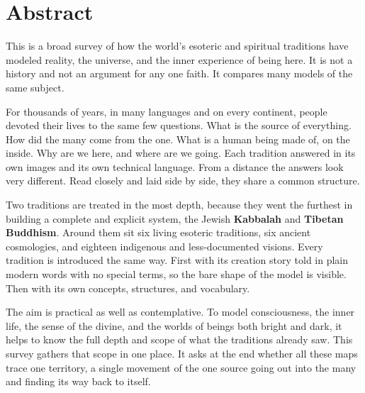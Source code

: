 \chapter*{Abstract}

This is a broad survey of how the world's esoteric and spiritual traditions have modeled reality, the
universe, and the inner experience of being here. It is not a history and not an argument for any one faith.
It compares many models of the same subject.

For thousands of years, in many languages and on every continent, people devoted their lives to the same few
questions. What is the source of everything. How did the many come from the one. What is a human being made
of, on the inside. Why are we here, and where are we going. Each tradition answered in its own images and its
own technical language. From a distance the answers look very different. Read closely and laid side by side,
they share a common structure.

Two traditions are treated in the most depth, because they went the furthest in building a complete and
explicit system, the Jewish \textbf{Kabbalah} and \textbf{Tibetan Buddhism}. Around them sit six living
esoteric traditions, six ancient cosmologies, and eighteen indigenous and less-documented visions. Every
tradition is introduced the same way. First with its creation story told in plain modern words with no
special terms, so the bare shape of the model is visible. Then with its own concepts, structures, and
vocabulary.

The aim is practical as well as contemplative. To model consciousness, the inner life, the sense of the
divine, and the worlds of beings both bright and dark, it helps to know the full depth and scope of what the
traditions already saw. This survey gathers that scope in one place. It asks at the end whether all these maps
trace one territory, a single movement of the one source going out into the many and finding its way back to
itself.
